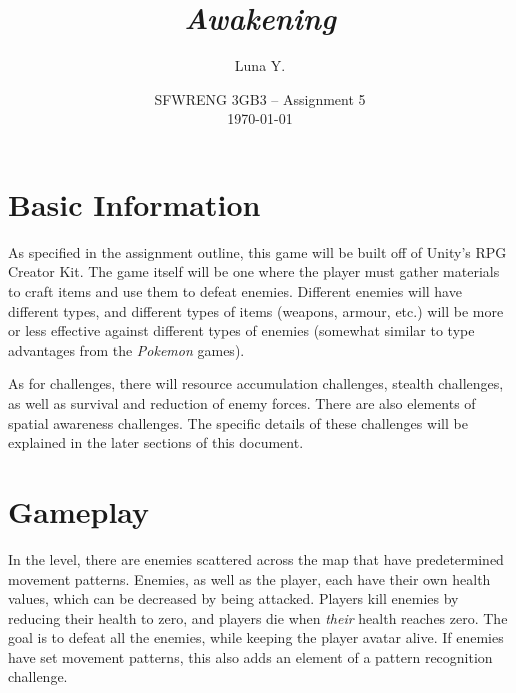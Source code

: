 \documentclass[10pt]{article}
\begin{document}
\title{\textit{Awakening}}
\author{Luna Y.}
\date{
    SFWRENG 3GB3 -- Assignment 5\\[0.25cm]
    \today
}
\maketitle

\tableofcontents

\section{Basic Information}

As specified in the assignment outline, this game will be built off of Unity's RPG Creator Kit.
The game itself will be one where the player must gather materials to craft items and use them to defeat enemies.
Different enemies will have different types, and different types of items (weapons, armour, etc.) will be more or
less effective against different types of enemies (somewhat similar to type advantages from the \textit{Pokemon} games).

As for challenges, there will resource accumulation challenges, stealth challenges, as well as survival and reduction of enemy forces.
There are also elements of spatial awareness challenges. The specific details of these challenges will be explained in the
later sections of this document.

\section{Gameplay}

In the level, there are enemies scattered across the map that have predetermined movement patterns. Enemies, as well
as the player, each have their own health values, which can be decreased by being attacked. Players kill enemies
by reducing their health to zero, and players die when \textit{their} health reaches zero. The goal is to defeat
all the enemies, while keeping the player avatar alive. If enemies have set movement patterns,
this also adds an element of a pattern recognition challenge.
\end{document}

